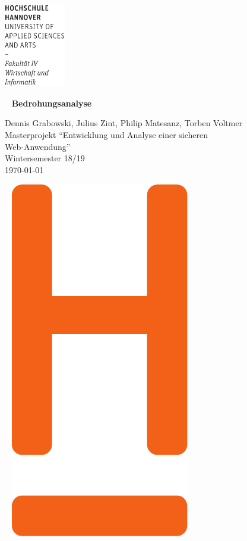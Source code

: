 \documentclass[12pt,DIV14,BCOR10mm,a4paper,parskip=half-,headsepline,headinclude,english,ngerman,bibliography=totocnumbered]{scrreprt}
\begin{document}
  \thispagestyle{empty} %
\includegraphics[width=0.2\textwidth]{Wortmarke_WI_schwarz}

   {  ~ \sffamily
  \vfill
  {\Huge\bfseries Bedrohungsanalyse}
  \bigskip

  {\Large
  Dennis Grabowski, Julius Zint, Philip Matesanz, Torben Voltmer \\[2ex]
  Masterprojekt \enquote{Entwicklung und Analyse einer sicheren \\Web-Anwendung} \\
  Wintersemester 18/19
 \\[5ex]
   \today }
}
 \vfill

  ~ \hfill
  \includegraphics[height=0.3\paperheight]{H_WI_Pantone1665}
\end{document}
